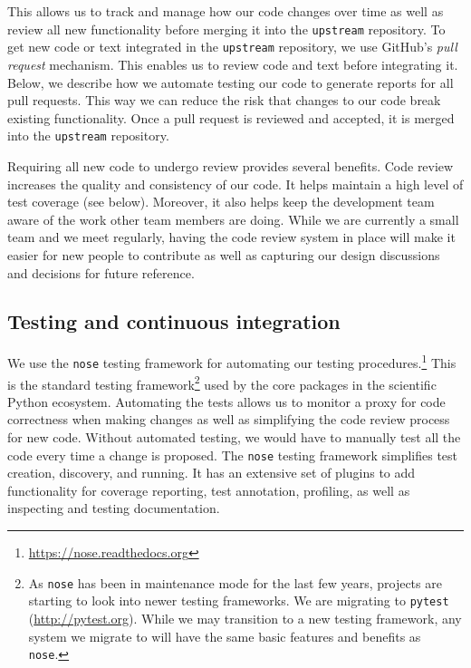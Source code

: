 \documentclass[]{article}
\begin{document}
This allows us to track and manage how our code changes over time as well as
review all new functionality before merging it into the \texttt{upstream}
repository.
To get new code or text integrated in the \texttt{upstream} repository, we use
GitHub's \emph{pull request} mechanism.
This enables us to review code and text before integrating it.
Below, we describe how we automate testing our code to generate reports for all
pull requests.
This way we can reduce the risk that changes to our code break existing
functionality.
Once a pull request is reviewed and accepted, it is merged into the
\texttt{upstream} repository.

Requiring all new code to undergo review provides several benefits.
Code review increases the quality and consistency of our code.
It helps maintain a high level of test coverage (see below).
Moreover, it also helps keep the development team aware of the work other team
members are doing.
While we are currently a small team and we meet regularly, having the code
review system in place will make it easier for new people to contribute as well
as capturing our design discussions and decisions for future reference.

\subsection{\label{sec:test}Testing and continuous integration}

We use the \texttt{nose} testing framework for automating our testing
procedures.\footnote{\url{https://nose.readthedocs.org}}
This is the standard testing framework\footnote{
    As \texttt{nose} has been in
    maintenance mode for the last few years, projects are starting to look
    into newer testing frameworks.
    We are migrating to \texttt{pytest} (\url{http://pytest.org}).
    While we may transition to a new testing framework, any system we
    migrate to will have the same basic features and benefits as \texttt{nose}.
}
used by the core packages in the scientific Python ecosystem.
Automating the tests allows us to monitor a proxy for code correctness when
making changes as well as simplifying the code review process for new code.
Without automated testing, we would have to manually test all the code every
time a change is proposed.
The \texttt{nose} testing framework simplifies test creation, discovery, and
running.
It has an extensive set of plugins to add functionality for coverage reporting,
test annotation, profiling, as well as inspecting and testing documentation.
\end{document}
